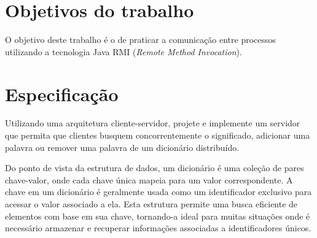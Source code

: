 \documentclass[12pt,brazil, a4paper, fullpage]{article}
\begin{document}
    \lstset{language=Java,
        basicstyle=\small, %
        showstringspaces=false}

\thispagestyle{plain}





\section{Objetivos do trabalho}

O objetivo deste trabalho é o de praticar a comunicação entre processos utilizando a tecnologia Java RMI (\textit{Remote Method Invocation}).

\section{Especificação}

\indent \indent Utilizando uma arquitetura cliente-servidor, projete e implemente um servidor que permita que clientes busquem concorrentemente o significado, adicionar uma palavra ou remover uma palavra de um dicionário distribuído.

Do ponto de vista da estrutura de dados, um dicionário é uma coleção de pares chave-valor, onde cada chave única mapeia para um valor correspondente. A chave em um dicionário é geralmente usada como um identificador exclusivo para acessar o valor associado a ela. Esta estrutura permite uma busca eficiente de elementos com base em sua chave, tornando-a ideal para muitas situações onde é necessário armazenar e recuperar informações associadas a identificadores únicos.
\end{document}
